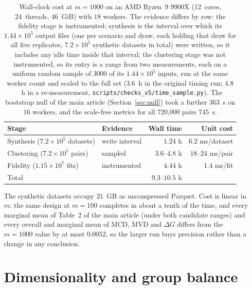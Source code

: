 \documentclass[pdflatex,referee]{sn-jnl}
\begin{document}
\begin{table}[!htbp]
\centering
\caption{Wall-clock cost at $m = 1000$ on an AMD Ryzen~9 9900X (12~cores,
         24~threads, $46$~GiB) with $18$ workers. The evidence differs by row:
         the fidelity stage is instrumented; synthesis is the interval over
         which its $1.44 \times 10^{5}$ output files (one per scenario and draw,
         each holding that draw for all five replicates, $7.2 \times 10^{5}$
         synthetic datasets in total) were written, so it includes any
         idle time inside that interval; the clustering stage was not
         instrumented, so its entry is a range from two measurements, each on
         a uniform random sample of $3000$ of its $1.44 \times 10^{5}$ inputs,
         run at the same worker count and scaled to the full set ($3.6$~h in
         the original timing run; $4.8$~h in a re-measurement,
         \texttt{scripts/checks\_v5/time\_sample.py}). The
         bootstrap null of the main article (Section~\ref{sec:null}) took a
         further $363$~s on $16$ workers, and the scale-free metrics for all
         720{,}000 pairs $745$~s.}
\label{tabS:cost}
\small
\begin{tabular}{llrr}
\toprule
Stage & Evidence & Wall time & Unit cost \\
\midrule
Synthesis ($7.2 \times 10^{5}$ datasets)  & write interval & $1.24$ h & $6.2$ ms/dataset \\
Clustering ($7.2 \times 10^{5}$ pairs)    & sampled        & $3.6$--$4.8$ h & $18$--$24$ ms/pair \\
Fidelity ($1.15 \times 10^{7}$ fits)      & instrumented   & $4.44$ h & $1.4$ ms/fit \\
\midrule
Total & & $9.3$--$10.5$ h & \\
\bottomrule
\end{tabular}
\end{table}

The synthetic datasets occupy $21$~GB as uncompressed Parquet. Cost is linear in
$m$: the same design at $m = 100$ completes in about a tenth of the time, and
every marginal mean of Table~2 of the main article (under both candidate
ranges) and every overall and marginal mean of MCD, MVD and $\Delta G$ differs
from the $m = 1000$ value by at most $0.0052$, so the larger run buys precision
rather than a change in any conclusion.

\clearpage
\section{Dimensionality and group balance}\label{secS:balance}
\end{document}
